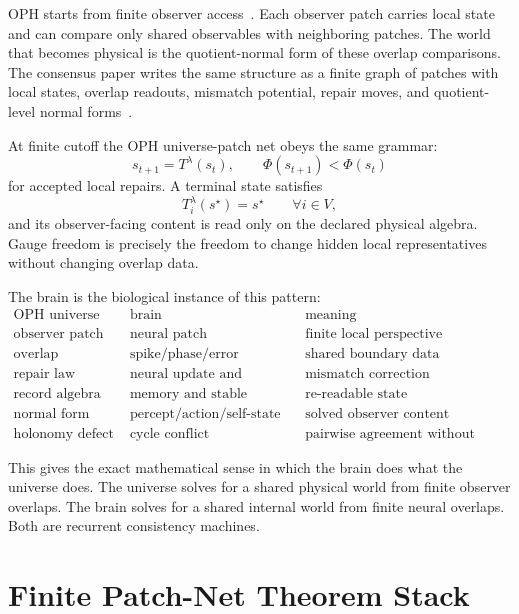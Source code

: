 \documentclass[11pt]{article}
\theoremstyle{remark}
\theoremstyle{plain}
\begin{document}
OPH starts from finite observer access~\cite{ObserversAreAllYouNeed}. Each observer patch carries local state and can compare only shared observables with neighboring patches. The world that becomes physical is the quotient-normal form of these overlap comparisons. The consensus paper writes the same structure as a finite graph of patches with local states, overlap readouts, mismatch potential, repair moves, and quotient-level normal forms~\cite{RealityAsConsensusProtocol}.

At finite cutoff the OPH universe-patch net obeys the same grammar:
\[
s_{t+1}=T^\lambda(s_t),
\qquad
\Phi(s_{t+1})<\Phi(s_t)
\]
for accepted local repairs. A terminal state satisfies
\[
T_i^\lambda(s^\star)=s^\star
\qquad\forall i\in V,
\]
and its observer-facing content is read only on the declared physical algebra. Gauge freedom is precisely the freedom to change hidden local representatives without changing overlap data.

The brain is the biological instance of this pattern:
\[
\begin{array}{ccc}
\text{OPH universe} & \text{brain} & \text{meaning}\\
\hline
\text{observer patch} & \text{neural patch} & \text{finite local perspective}\\
\text{overlap observable} & \text{spike/phase/error interface} & \text{shared boundary data}\\
\text{repair law} & \text{neural update and plasticity} & \text{mismatch correction}\\
\text{record algebra} & \text{memory and stable activity} & \text{re-readable state}\\
\text{normal form} & \text{percept/action/self-state} & \text{solved observer content}\\
\text{holonomy defect} & \text{cycle conflict} & \text{pairwise agreement without global fit}
\end{array}
\]

This gives the exact mathematical sense in which the brain does what the universe does. The universe solves for a shared physical world from finite observer overlaps. The brain solves for a shared internal world from finite neural overlaps. Both are recurrent consistency machines.

\section{Finite Patch-Net Theorem Stack}
\end{document}
